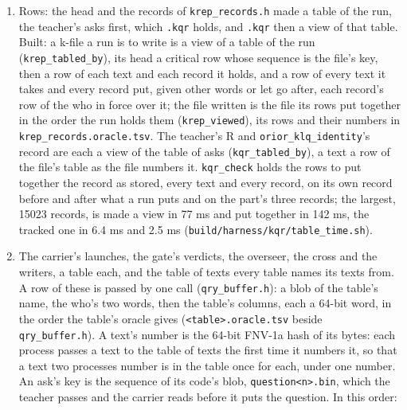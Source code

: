 \begin{enumerate}
\item Rows: the head and the records of \texttt{krep\_\allowbreak{}records.\allowbreak{}h} made a table of the run, the teacher's asks first, which \texttt{.\allowbreak{}kqr} holds, and \texttt{.\allowbreak{}kqr} then a view of that table. Built: a k-file a run is to write is a view of a table of the run (\texttt{krep\_\allowbreak{}tabled\_\allowbreak{}by}), its head a critical row whose sequence is the file's key, then a row of each text and each record it holds, and a row of every text it takes and every record put, given other words or let go after, each record's row of the who in force over it; the file written is the file its rows put together in the order the run holds them (\texttt{krep\_\allowbreak{}viewed}), its rows and their numbers in \texttt{krep\_\allowbreak{}records.\allowbreak{}oracle.\allowbreak{}tsv}. The teacher's R and \texttt{orior\_\allowbreak{}klq\_\allowbreak{}identity}'s record are each a view of the table of asks (\texttt{kqr\_\allowbreak{}tabled\_\allowbreak{}by}), a text a row of the file's table as the file numbers it. \texttt{kqr\_\allowbreak{}check} holds the rows to put together the record as stored, every text and every record, on its own record before and after what a run puts and on the part's three records; the largest, 15023 records, is made a view in 77 ms and put together in 142 ms, the tracked one in 6.4 ms and 2.5 ms (\texttt{build/\allowbreak{}harness/\allowbreak{}kqr/\allowbreak{}table\_\allowbreak{}time.\allowbreak{}sh}).
\item The carrier's launches, the gate's verdicts, the overseer, the cross and the writers, a table each, and the table of texts every table names its texts from. A row of these is passed by one call (\texttt{qry\_\allowbreak{}buffer.\allowbreak{}h}): a blob of the table's name, the who's two words, then the table's columns, each a 64-bit word, in the order the table's oracle gives (\texttt{<table>.\allowbreak{}oracle.\allowbreak{}tsv} beside \texttt{qry\_\allowbreak{}buffer.\allowbreak{}h}). A text's number is the 64-bit FNV-1a hash of its bytes: each process passes a text to the table of texts the first time it numbers it, so that a text two processes number is in the table once for each, under one number. An ask's key is the sequence of its code's blob, \texttt{question<n>.\allowbreak{}bin}, which the teacher passes and the carrier reads before it puts the question. In this order:


\end{enumerate}
